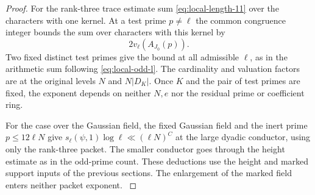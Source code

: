 \begin{proof}
For the rank-three trace estimate sum \eqref{eq:local-length-11} over the
characters with one kernel. At a test prime \(p\ne\ell\) the common congruence integer bounds the sum over characters with this kernel by
\[
 2v_\ell(A_{J_0}(p)).
\]
Two fixed distinct test primes
give the bound at all admissible
\(\ell\), as in the arithmetic sum
following \eqref{eq:local-odd-l}. The cardinality
and valuation factors are at the
original levels \(N\) and \(N|D_K|\).
Once \(K\) and the pair of test
primes are fixed, the exponent
depends on neither \(N,e\) nor the
residual prime or coefficient
ring.

For the case over the Gaussian field, the fixed
Gaussian field and the inert
prime \(p\le 12\ell N\) give
\(s_\ell(\psi,1)\log\ell\ll
(\ell N)^C\) at the large
dyadic conductor, using only the
rank-three packet. The smaller
conductor goes through the
height estimate as in the
odd-prime count. These deductions
use the height and marked
support inputs of the previous
sections. The enlargement of the
marked field enters neither
packet exponent.
\label{cor:ordinary-rank-three-length-8}
\end{proof}
